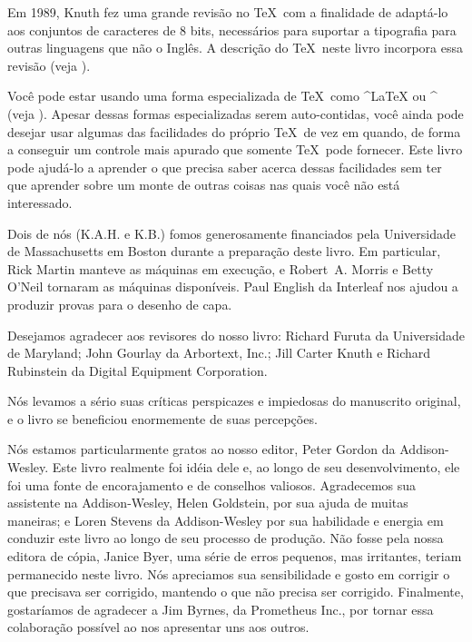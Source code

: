 Em 1989, Knuth fez uma grande revis\~ao no \TeX\ com a finalidade de 
adapt\'a-lo aos conjuntos de caracteres de $8$ bits, necess\'arios para 
suportar a tipografia para outras linguagens que n\~ao o Ingl\^es.  A 
descri\c c\~ao do \TeX\ neste livro incorpora essa revis\~ao (veja 
).

{\tighten Voc\^e pode estar usando uma forma especializada de \TeX\, 
como ^{\LaTeX} ou ^{\AMSTeX} (veja ).  Apesar dessas 
formas especializadas serem auto-contidas, voc\^e ainda pode desejar 
usar algumas das facilidades do pr\'oprio \TeX\ de vez em quando, de 
forma a conseguir um controle mais apurado que somente \TeX\ pode 
fornecer.  Este livro pode ajud\'a-lo a aprender o que precisa saber 
acerca dessas facilidades sem ter que aprender sobre um monte de outras 
coisas nas quais voc\^e n\~ao est\'a interessado.  \par}

Dois de n\'os (K.A.H. e K.B.) fomos generosamente financiados pela 
Universidade de Massachusetts em Boston durante a prepara\c c\~ao deste 
livro.  Em particular, Rick Martin manteve as m\'aquinas em 
execu\c c\~ao, e Robert~A. Morris e Betty O'Neil tornaram as m\'aquinas 
dispon\'iveis.  Paul English da Interleaf nos ajudou a produzir provas 
para o desenho de capa.

Desejamos agradecer aos revisores do nosso livro: Richard Furuta da 
Universidade de Maryland; John Gourlay da Arbortext, Inc.; Jill Carter
Knuth e Richard Rubinstein da Digital Equipment Corporation.

N\'os levamos a s\'erio suas cr\'iticas perspicazes e impiedosas do 
manuscrito original, e o livro se beneficiou enormemente de suas 
percep\c c\~oes.

N\'os estamos particularmente gratos ao nosso editor, Peter Gordon da 
Addison-Wesley.  Este livro realmente foi id\'eia dele e, ao longo de 
seu desenvolvimento, ele foi uma fonte de encorajamento e de conselhos 
valiosos.  Agradecemos sua assistente na Addison-Wesley, Helen 
Goldstein, por sua ajuda de muitas maneiras; e Loren Stevens da 
Addison-Wesley por sua habilidade e energia em conduzir este livro ao 
longo de seu processo de produ\c c\~ao.  N\~ao fosse pela nossa editora 
de c\'opia, Janice Byer, uma s\'erie de erros pequenos, mas irritantes, 
teriam permanecido neste livro.  N\'os apreciamos sua sensibilidade e 
gosto em corrigir o que precisava ser corrigido, mantendo o que n\~ao 
precisa ser corrigido.  Finalmente, gostar\'iamos de agradecer a Jim 
Byrnes, da Prometheus Inc., por tornar essa colabora\c c\~ao poss\'ivel 
ao nos apresentar uns aos outros.
\baselineskip


